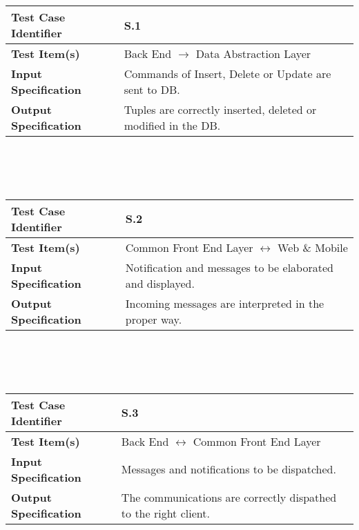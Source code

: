 {\renewcommand{\arraystretch}{1.5}

\begin{tabularx}{\textwidth}{l X}
    \hline 
    \textbf{Test Case Identifier} & S.1\\ 
    \hline 
    
    \textbf{Test Item(s)} & Back End $\rightarrow$ Data Abstraction Layer\\
    \hline 
    
    \textbf{Input Specification} & Commands of Insert, Delete or Update are sent to DB. \\
    \hline 
    
    \textbf{Output Specification} & Tuples are correctly inserted, deleted or modified in the DB. \\
    \hline 

\end{tabularx}
\\ \\ \\
\begin{tabularx}{\textwidth}{l X}
    \hline 
    \textbf{Test Case Identifier} & S.2\\ 
    \hline 
    
    \textbf{Test Item(s)} & Common Front End Layer $\leftrightarrow$ Web \& Mobile\\
    \hline 
    
    \textbf{Input Specification} & Notification and messages to be elaborated and displayed.\\
    \hline 
    
    \textbf{Output Specification} & Incoming messages are interpreted in the proper way.\\
    \hline 

\end{tabularx}
\\ \\ \\
\begin{tabularx}{\textwidth}{l X}
    \hline 
    \textbf{Test Case Identifier} & S.3\\ 
    \hline 
    
    \textbf{Test Item(s)} & Back End $\leftrightarrow$ Common Front End Layer\\
    \hline 
    
    \textbf{Input Specification} & Messages and notifications to be dispatched.\\
    \hline 
    
    \textbf{Output Specification} & The communications are correctly dispathed to the right client.\\
    \hline 
\end{tabularx}}
